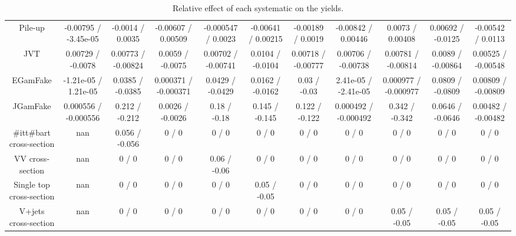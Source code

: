 \begin{table}[htbp]
\begin{center}
\begin{tabular}{|c|c|c|c|c|c|c|c|c|c|c|}
  Pile-up & -0.00795 / -3.45e-05 & -0.0014 / 0.0035 & -0.00607 / 0.00509 & -0.000547 / 0.0023 & -0.00641 / 0.00215 & -0.00189 / 0.0019 & -0.00842 / 0.00446 & 0.0073 / 0.00408 & 0.00692 / -0.0125 & -0.00542 / 0.0113 \\ 
  JVT & 0.00729 / -0.0078 & 0.00773 / -0.00824 & 0.0059 / -0.0075 & 0.00702 / -0.00741 & 0.0104 / -0.0104 & 0.00718 / -0.00777 & 0.00706 / -0.00738 & 0.00781 / -0.00814 & 0.0089 / -0.00864 & 0.00525 / -0.00548 \\ 
  EGamFake & -1.21e-05 / 1.21e-05 & 0.0385 / -0.0385 & 0.000371 / -0.000371 & 0.0429 / -0.0429 & 0.0162 / -0.0162 & 0.03 / -0.03 & 2.41e-05 / -2.41e-05 & 0.000977 / -0.000977 & 0.0809 / -0.0809 & 0.00809 / -0.00809 \\ 
  JGamFake & 0.000556 / -0.000556 & 0.212 / -0.212 & 0.0026 / -0.0026 & 0.18 / -0.18 & 0.145 / -0.145 & 0.122 / -0.122 & 0.000492 / -0.000492 & 0.342 / -0.342 & 0.0646 / -0.0646 & 0.00482 / -0.00482 \\ 
  #it{t#bar{t}} cross-section &    nan    & 0.056 / -0.056 & 0 / 0 & 0 / 0 & 0 / 0 & 0 / 0 & 0 / 0 & 0 / 0 & 0 / 0 & 0 / 0 \\ 
  VV cross-section &    nan    & 0 / 0 & 0 / 0 & 0.06 / -0.06 & 0 / 0 & 0 / 0 & 0 / 0 & 0 / 0 & 0 / 0 & 0 / 0 \\ 
  Single top cross-section &    nan    & 0 / 0 & 0 / 0 & 0 / 0 & 0.05 / -0.05 & 0 / 0 & 0 / 0 & 0 / 0 & 0 / 0 & 0 / 0 \\ 
  V+jets cross-section &    nan    & 0 / 0 & 0 / 0 & 0 / 0 & 0 / 0 & 0 / 0 & 0 / 0 & 0.05 / -0.05 & 0.05 / -0.05 & 0.05 / -0.05 \\ 
\hline 
\end{tabular} 
\caption{Relative effect of each systematic on the yields.} 
\end{center} 
\end{table} 
